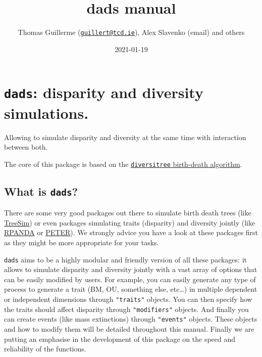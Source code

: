 \documentclass[]{book}
\title{dads manual}
\author{Thomas Guillerme (\href{mailto:guillert@tcd.ie}{\nolinkurl{guillert@tcd.ie}}), Alex Slavenko (email) and others}
\date{2021-01-19}
\begin{document}
\maketitle

{
\setcounter{tocdepth}{1}
\tableofcontents
}
\hypertarget{dads-disparity-and-diversity-simulations.}{%
\chapter{\texorpdfstring{\texttt{dads}: disparity and diversity simulations.}{dads: disparity and diversity simulations.}}\label{dads-disparity-and-diversity-simulations.}}

Allowing to simulate disparity and diversity at the same time with interaction between both.

The core of this package is based on the \href{https://github.com/cran/diversitree/blob/master/R/simulate-bd.R}{\texttt{diversitree} birth-death algorithm}.

\hypertarget{what-is-dads}{%
\section{\texorpdfstring{What is \texttt{dads}?}{What is dads?}}\label{what-is-dads}}

There are some very good packages out there to simulate birth death trees (like \href{https://github.com/tanja819/TreeSim}{TreeSim}) or even packages simulating traits (disparity) and diversity jointly (like \href{https://github.com/cran/RPANDA}{RPANDA} or \href{https://github.com/PuttickMacroevolution/PETER}{PETER}).
We strongly advice you have a look at these packages first as they might be more appropriate for your tasks.

\texttt{dads} aims to be a highly modular and friendly version of all these packages: it allows to simulate disparity and diversity jointly with a vast array of options that can be easily modified by users.
For example, you can easily generate any type of process to generate a trait (BM, OU, something else, etc\ldots{}) in multiple dependent or independent dimensions through \texttt{"traits"} objects.
You can then specify how the traits should affect disparity through \texttt{"modifiers"} objects. And finally you can create events (like mass extinctions) through \texttt{"events"} objects.
These objects and how to modify them will be detailed throughout this manual.
Finally we are putting an emphasise in the development of this package on the speed and reliability of the functions.
\end{document}
